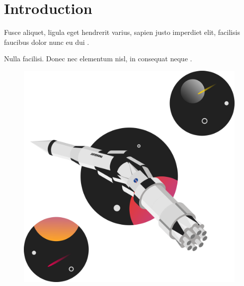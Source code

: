 \section{Introduction}

\lipsum[4][2-18]
Fusce aliquet, ligula eget hendrerit varius, sapien justo imperdiet elit, facilisis
faucibus dolor nunc eu dui .

\lipsum[2]
Nulla facilisi. Donec nec elementum nisl, in consequat neque \cite[p.100]{stephenson1998}.

\begin{figure}[ht]
    \centering
    \includegraphics[scale=0.2]{images/catastrophic-failure.png}
    \caption{\lipsum[1][1]}\label{fig:test}
\end{figure}
